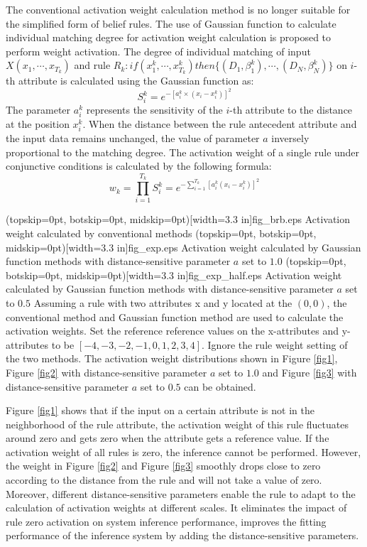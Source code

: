 \documentclass{ieeeaccess}
\begin{document}
The conventional activation weight calculation method is no longer suitable for the simplified form of belief rules.
The use of Gaussian function to calculate individual matching degree for activation weight calculation is proposed to perform weight activation.
The degree of individual matching of input $X(x_1,\cdots,x_{T_k})$ and rule $R_k:if(x_1^k , \cdots , x_{T_k}^k)then\{(D_1,\beta_1^k),\cdots,(D_N,\beta_N^k)\}$ on $i$-th attribute is calculated using the Gaussian function as:
\begin{equation}
    S_i^k=e^{-[a_i^k\times(x_i-x_i^k)]^2}
\end{equation}
The parameter $a_i^k$ represents the sensitivity of the $i$-th attribute to the distance at the position $x_i^k$. When the distance between the rule antecedent attribute and the input data remains unchanged,
the value of parameter $a$ inversely proportional to the matching degree.
The activation weight of a single rule under conjunctive conditions is calculated by the following formula:
\begin{equation}
    w_k=\prod_{i=1}^{T_k}S_i^k=e^{-\sum_{i=1}^{T_k}[a_i^k(x_i-x_i^k)]^2}
\end{equation}


\Figure[!t](topskip=0pt, botskip=0pt, midskip=0pt)[width=3.3 in]{fig_brb.eps}
{Activation weight calculated by conventional methods\label{fig1}}
\Figure[!t](topskip=0pt, botskip=0pt, midskip=0pt)[width=3.3 in]{fig_exp.eps}
{Activation weight calculated by Gaussian function methods with distance-sensitive parameter $a$ set to $1.0$\label{fig2}}
\Figure[!t](topskip=0pt, botskip=0pt, midskip=0pt)[width=3.3 in]{fig_exp_half.eps}
{Activation weight calculated by Gaussian function methods with distance-sensitive parameter $a$ set to $0.5$\label{fig3}}
Assuming a rule with two attributes x and y located at the $(0,0)$, the conventional method and Gaussian function method are used to calculate the activation weights.
Set the reference reference values on the x-attributes and y-attributes to be $[-4,-3,-2,-1,0,1,2,3,4]$.
Ignore the rule weight setting of the two methods.
The activation weight distributions shown in Figure \ref{fig1},
Figure \ref{fig2} with distance-sensitive parameter $a$ set to $1.0$ and
Figure \ref{fig3} with distance-sensitive parameter $a$ set to $0.5$ can be obtained.

Figure \ref{fig1} shows that if the input on a certain attribute is not in the neighborhood of the rule attribute,
the activation weight of this rule fluctuates around zero and gets zero when the attribute gets a reference value.
If the activation weight of all rules is zero, the inference cannot be performed.
However, the weight in Figure \ref{fig2} and Figure \ref{fig3} smoothly drops close to zero according to the distance from the rule and will not take a value of zero.
Moreover, different distance-sensitive parameters enable the rule to adapt to the calculation of activation weights at different scales.
It eliminates the impact of rule zero activation on system inference performance,
improves the fitting performance of the inference system by adding the distance-sensitive parameters.
\end{document}
